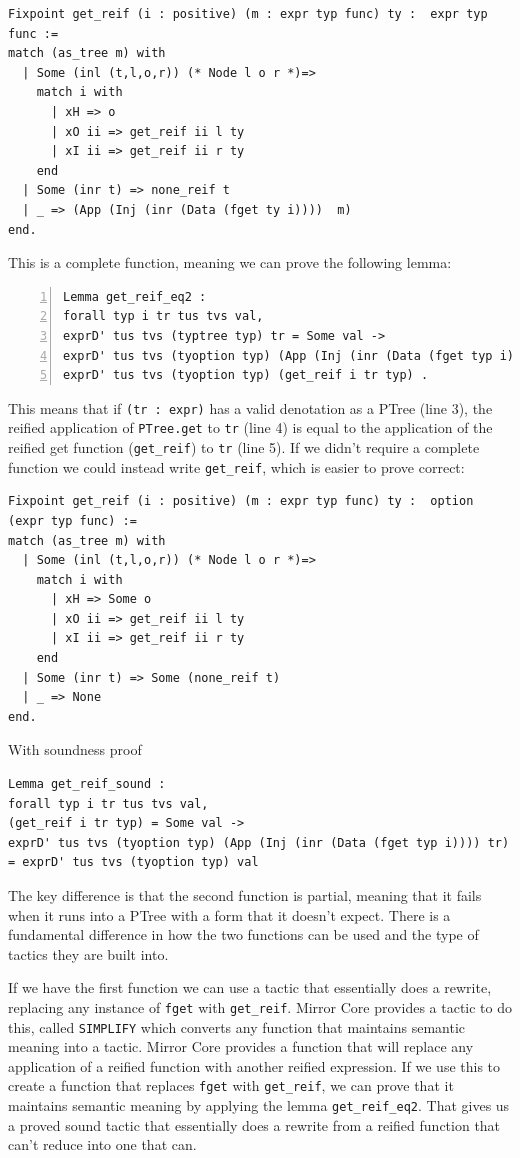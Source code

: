 \documentclass{puthesis}
\begin{document}
\begin{lstlisting}
Fixpoint get_reif (i : positive) (m : expr typ func) ty :  expr typ func :=
match (as_tree m) with
  | Some (inl (t,l,o,r)) (* Node l o r *)=>
    match i with 
      | xH => o
      | xO ii => get_reif ii l ty 
      | xI ii => get_reif ii r ty 
    end
  | Some (inr t) => none_reif t
  | _ => (App (Inj (inr (Data (fget ty i))))  m)
end.
\end{lstlisting}

This is a complete function, meaning we can prove the following lemma:

\begin{lstlisting}[numbers=left]
Lemma get_reif_eq2 :
forall typ i tr tus tvs val,
exprD' tus tvs (typtree typ) tr = Some val ->
exprD' tus tvs (tyoption typ) (App (Inj (inr (Data (fget typ i)))) tr)  =
exprD' tus tvs (tyoption typ) (get_reif i tr typ) .
\end{lstlisting}
This means that if \lstinline|(tr : expr)| has a valid denotation as a
PTree (line 3),
the reified application of \lstinline|PTree.get| to \lstinline|tr| (line 4) is equal to
the application of the reified get function (\lstinline|get_reif|) to
\lstinline|tr| (line 5).
If we didn't require a complete function we could
instead write \lstinline|get_reif|, which is easier to prove correct:

\begin{lstlisting}
Fixpoint get_reif (i : positive) (m : expr typ func) ty :  option (expr typ func) :=
match (as_tree m) with
  | Some (inl (t,l,o,r)) (* Node l o r *)=>
    match i with 
      | xH => Some o
      | xO ii => get_reif ii l ty 
      | xI ii => get_reif ii r ty 
    end
  | Some (inr t) => Some (none_reif t)
  | _ => None
end.
\end{lstlisting}

With soundness proof

\begin{lstlisting}
Lemma get_reif_sound :
forall typ i tr tus tvs val,
(get_reif i tr typ) = Some val ->
exprD' tus tvs (tyoption typ) (App (Inj (inr (Data (fget typ i)))) tr)
= exprD' tus tvs (tyoption typ) val
\end{lstlisting}

The key difference is that the second function is partial, meaning
that it 
fails when it runs into a PTree with a form that it doesn't expect. There is a
fundamental difference in how the two functions can be used and the
type of tactics they are built into. 

If we have the first function we can use a tactic that essentially
does a rewrite, replacing any instance of \lstinline|fget| with
\lstinline|get_reif|. Mirror Core provides a tactic to do this, called
\lstinline|SIMPLIFY| which converts any function that maintains
semantic meaning into a tactic. Mirror Core provides a function that
will replace any application of a reified function with another
reified expression. If we use this to create a function that replaces
\lstinline|fget| with \lstinline|get_reif|, we can prove that it
maintains semantic meaning by applying the lemma
\lstinline|get_reif_eq2|. That gives us a proved sound tactic that
essentially does a rewrite from a reified function that can't reduce
into one that can. 
\end{document}
